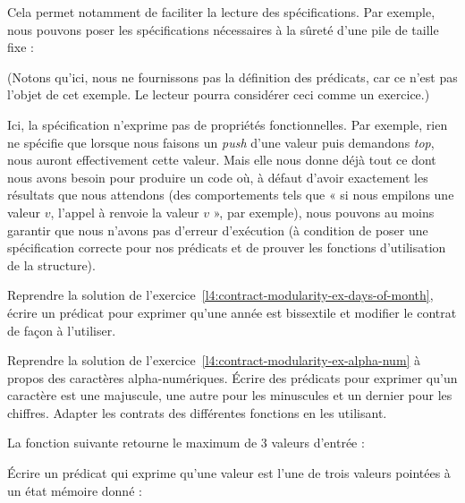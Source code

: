 Cela permet notamment de faciliter la lecture des spécifications. Par exemple,
nous pouvons poser les spécifications nécessaires à la sûreté d'une pile
de taille fixe :




(Notons qu'ici, nous ne fournissons pas la définition des prédicats, car ce n'est
pas l'objet de cet exemple. Le lecteur pourra considérer ceci comme un exercice.)

Ici, la spécification n'exprime pas de propriétés fonctionnelles. Par exemple,
rien ne spécifie que lorsque nous faisons un \textit{push} d'une valeur puis
demandons \textit{top}, nous auront effectivement cette valeur. Mais elle nous donne
déjà tout ce dont nous avons besoin pour produire un code où, à défaut d'avoir
exactement les résultats que nous attendons (des comportements tels que « si
nous empilons une valeur $v$, l'appel à  renvoie la valeur $v$ », par exemple), nous
pouvons au moins garantir que nous n'avons pas d'erreur d'exécution (à condition
de poser une spécification correcte pour nos prédicats et de prouver les fonctions
d'utilisation de la structure).






Reprendre la solution de l'exercice~\ref{l4:contract-modularity-ex-days-of-month},
écrire un prédicat pour exprimer qu'une année est bissextile et modifier le contrat
de façon à l'utiliser.






Reprendre la solution de l'exercice~\ref{l4:contract-modularity-ex-alpha-num} à
propos des caractères alpha-numériques. Écrire des prédicats pour exprimer qu'un
caractère est une majuscule, une autre pour les minuscules et un dernier pour les
chiffres. Adapter les contrats des différentes fonctions en les utilisant.






La fonction suivante retourne le maximum de 3 valeurs d'entrée :




Écrire un prédicat qui exprime qu'une valeur est l'une de trois valeurs pointées
à un état mémoire donné :


